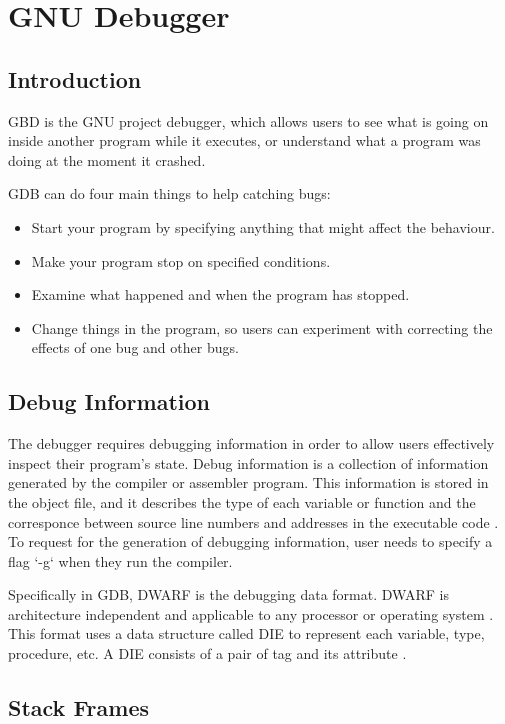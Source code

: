 \chapter{GNU Debugger} \label{GDB}

\section{Introduction}
GBD is the GNU project debugger, which allows users to see what is going on
inside another program while it executes, or understand what a program was
doing at the moment it crashed.

GDB can do four main things to help catching bugs:
\begin{itemize}
\item Start your program by specifying anything that might affect the
behaviour.
\item Make your program stop on specified conditions.
\item Examine what happened and when the program has stopped.
\item Change things in the program, so users can experiment with correcting the
effects of one bug and other bugs.
\end{itemize}

\section{Debug Information}
The debugger requires debugging information in order to allow users effectively inspect
their program's state. Debug information is a collection of information
generated by the compiler or assembler program. This information is stored in
the object file, and it describes the type of each variable or function and
the corresponce between source line numbers and addresses in the executable
code \cite{reference6}. To request for the generation of debugging information,
user needs to specify a flag `-g` when they run the compiler.

Specifically in GDB, DWARF is the debugging data format. DWARF is architecture
independent and applicable to any processor or operating system
\cite{reference7}. This format uses a data structure called DIE to represent
each variable, type, procedure, etc. A DIE consists of a pair of tag
and its attribute \cite{reference8}.

\section{Stack Frames}

